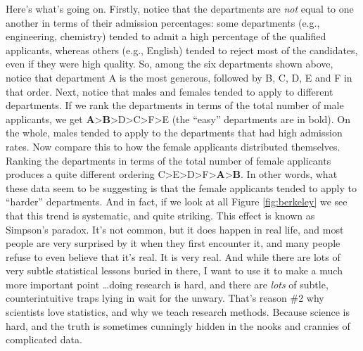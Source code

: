 \documentclass[
]{book}
\begin{document}
Here's what's going on. Firstly, notice that the departments are \emph{not} equal to one another in terms of their admission percentages: some departments (e.g., engineering, chemistry) tended to admit a high percentage of the qualified applicants, whereas others (e.g., English) tended to reject most of the candidates, even if they were high quality. So, among the six departments shown above, notice that department A is the most generous, followed by B, C, D, E and F in that order. Next, notice that males and females tended to apply to different departments. If we rank the departments in terms of the total number of male applicants, we get \textbf{A}\textgreater{}\textbf{B}\textgreater D\textgreater C\textgreater F\textgreater E (the ``easy'' departments are in bold). On the whole, males tended to apply to the departments that had high admission rates. Now compare this to how the female applicants distributed themselves. Ranking the departments in terms of the total number of female applicants produces a quite different ordering C\textgreater E\textgreater D\textgreater F\textgreater{}\textbf{A}\textgreater{}\textbf{B}. In other words, what these data seem to be suggesting is that the female applicants tended to apply to ``harder'' departments. And in fact, if we look at all Figure \ref{fig:berkeley} we see that this trend is systematic, and quite striking. This effect is known as Simpson's paradox. It's not common, but it does happen in real life, and most people are very surprised by it when they first encounter it, and many people refuse to even believe that it's real. It is very real. And while there are lots of very subtle statistical lessons buried in there, I want to use it to make a much more important point \ldots doing research is hard, and there are \emph{lots} of subtle, counterintuitive traps lying in wait for the unwary. That's reason \#2 why scientists love statistics, and why we teach research methods. Because science is hard, and the truth is sometimes cunningly hidden in the nooks and crannies of complicated data.
\end{document}
